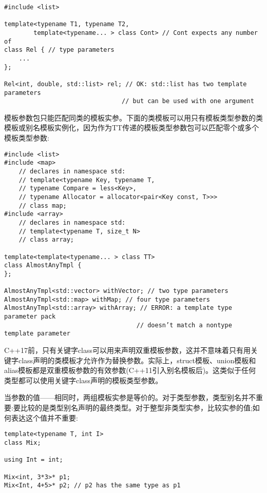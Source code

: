 \begin{lstlisting}[style=styleCXX]
#include <list>

template<typename T1, typename T2,
		template<typename... > class Cont> // Cont expects any number of
class Rel { // type parameters
	...
};

Rel<int, double, std::list> rel; // OK: std::list has two template parameters
								// but can be used with one argument
\end{lstlisting}

模板参数包只能匹配同类的模板实参。下面的类模板可以用只有模板类型参数的类模板或别名模板实例化，因为作为TT传递的模板类型参数包可以匹配零个或多个模板类型参数:

\begin{lstlisting}[style=styleCXX]
#include <list>
#include <map>
	// declares in namespace std:
	// template<typename Key, typename T,
	// typename Compare = less<Key>,
	// typename Allocator = allocator<pair<Key const, T>>>
	// class map;
#include <array>
	// declares in namespace std:
	// template<typename T, size_t N>
	// class array;
	
template<template<typename... > class TT>
class AlmostAnyTmpl {
};

AlmostAnyTmpl<std::vector> withVector; // two type parameters
AlmostAnyTmpl<std::map> withMap; // four type parameters
AlmostAnyTmpl<std::array> withArray; // ERROR: a template type parameter pack
									// doesn’t match a nontype template parameter
\end{lstlisting}

C++17前，只有关键字class可以用来声明双重模板参数，这并不意味着只有用关键字class声明的类模板才允许作为替换参数。实际上，struct模板、union模板和alias模板都是双重模板参数的有效参数(C++11引入别名模板后)。这类似于任何类型都可以使用关键字class声明的模板类型参数。


当参数的值——相同时，两组模板实参是等价的。对于类型参数，类型别名并不重要:要比较的是类型别名声明的最终类型。对于整型非类型实参，比较实参的值;如何表达这个值并不重要:

\begin{lstlisting}[style=styleCXX]
template<typename T, int I>
class Mix;

using Int = int;

Mix<int, 3*3>* p1;
Mix<Int, 4+5>* p2; // p2 has the same type as p1
\end{lstlisting}

